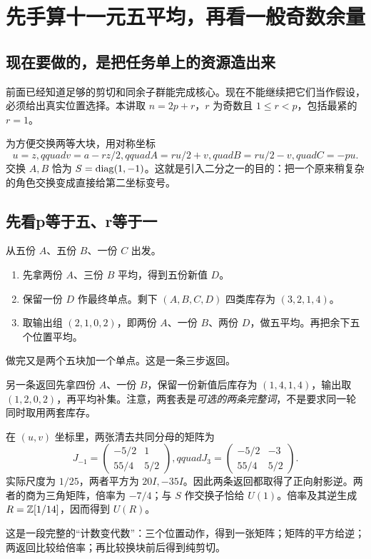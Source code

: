 \chapter{先手算十一元五平均，再看一般奇数余量}\label{ch:odd}
\section{现在要做的，是把任务单上的资源造出来}
前面已经知道足够的剪切和同余子群能完成核心。现在不能继续把它们当作假设，必须给出真实位置选择。本讲取 $n=2p+r$，$r$ 为奇数且 $1\le r<p$，包括最紧的 $r=1$。

为方便交换两等大块，用对称坐标
\[u=z,qquad v=a-rz/2,qquad
A=ru/2+v,quad B=ru/2-v,quad C=-pu.
\]
交换 $A,B$ 恰为 $S=\operatorname{diag}(1,-1)$。这就是引入二分之一的目的：把一个原来稍复杂的角色交换变成直接给第二坐标变号。

\section{先看p等于五、r等于一}
从五份 $A$、五份 $B$、一份 $C$ 出发。
\begin{enumerate}
\item 先拿两份 $A$、三份 $B$ 平均，得到五份新值 $D$。
\item 保留一份 $D$ 作最终单点。剩下 $(A,B,C,D)$ 四类库存为 $(3,2,1,4)$。
\item 取输出组 $(2,1,0,2)$，即两份 $A$、一份 $B$、两份 $D$，做五平均。再把余下五个位置平均。
\end{enumerate}
做完又是两个五块加一个单点。这是一条三步返回。

另一条返回先拿四份 $A$、一份 $B$，保留一份新值后库存为 $(1,4,1,4)$，输出取 $(1,2,0,2)$，再平均补集。注意，两套表是\emph{可选的两条完整词}，不是要求同一轮同时取用两套库存。

在 $(u,v)$ 坐标里，两张清去共同分母的矩阵为
\[
J_{-1}=\begin{pmatrix}-5/2&1\\55/4&5/2\end{pmatrix},qquad
J_3=\begin{pmatrix}-5/2&-3\\55/4&5/2\end{pmatrix}.
\]
实际尺度为 $1/25$，两者平方为 $20I,-35I$。因此两条返回都取得了正向射影逆。两者的商为三角矩阵，倍率为 $-7/4$；与 $S$ 作交换子恰给 $U(1)$。倍率及其逆生成 $R=\mathbb Z[1/14]$，因而得到 $U(R)$。

这是一段完整的“计数变代数”：三个位置动作，得到一张矩阵；矩阵的平方给逆；两返回比较给倍率；再比较换块前后得到纯剪切。

